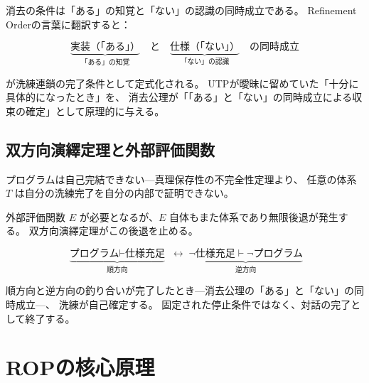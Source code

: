 \documentclass[11pt,a4paper]{ltjsarticle}
\theoremstyle{definition}
\begin{document}
消去の条件は「ある」の知覚と「ない」の認識の同時成立である。
Refinement Orderの言葉に翻訳すると：

\begin{equation}
\underbrace{\text{実装（「ある」）}}_{\text{「ある」の知覚}} \quad \text{と} \quad
\underbrace{\text{仕様（「ない」）}}_{\text{「ない」の認識}} \quad \text{の同時成立}
\end{equation}

が洗練連鎖の完了条件として定式化される。
UTPが曖昧に留めていた「十分に具体的になったとき」を、
消去公理が「「ある」と「ない」の同時成立による収束の確定」として原理的に与える。

\subsection{双方向演繹定理と外部評価関数}

プログラムは自己完結できない---真理保存性の不完全性定理\cite{Chiba2026_incompleteness}より、
任意の体系 $T$ は自分の洗練完了を自分の内部で証明できない。

外部評価関数 $E$ が必要となるが、$E$ 自体もまた体系であり無限後退が発生する。
双方向演繹定理\cite{Chiba2026_bdt}がこの後退を止める。

\begin{equation}
\underbrace{\text{プログラム} \vdash \text{仕様充足}}_{\text{順方向}} \;\leftrightarrow\;
\underbrace{\neg\text{仕様充足} \vdash \neg\text{プログラム}}_{\text{逆方向}}
\end{equation}

順方向と逆方向の釣り合いが完了したとき---消去公理の「ある」と「ない」の同時成立---、
洗練が自己確定する。
固定された停止条件ではなく、対話の完了として終了する。

\section{ROPの核心原理}
\end{document}
